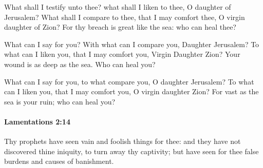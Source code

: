 			\begin{versebox}
					\item[BHS] 
					\item[LXX] 
					\item[ASV] What shall I testify unto thee? what shall I liken to thee, O daughter of Jerusalem? What shall I compare to thee, that I may comfort thee, O virgin daughter of Zion? For thy breach is great like the sea: who can heal thee?
					\item[NIV] What can I say for you? With what can I compare you, Daughter Jerusalem? To what can I liken you, that I may comfort you, Virgin Daughter Zion? Your wound is as deep as the sea. Who can heal you?
					\item[NRSV] What can I say for you, to what compare you, O daughter Jerusalem? To what can I liken you, that I may comfort you, O virgin daughter Zion? For vast as the sea is your ruin; who can heal you?
			\end{versebox}

		\paragraph{Lamentations 2:14} %
			\label{LAMENTATIONS-2-14}

			Thy prophets have seen vain and foolish things for thee: and they have not discovered thine iniquity, to turn away thy captivity; but have seen for thee false burdens and causes of banishment.

